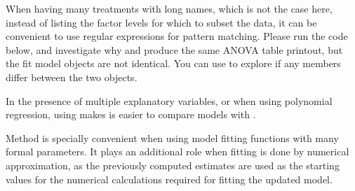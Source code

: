 \documentclass[krantz2]{krantz}\usepackage{knitr}
\begin{document}
\begin{knitrout}\footnotesize
{}\color{fgcolor}
\end{knitrout}

\begin{advplayground}
When having many treatments with long names, which is not the case here, instead of listing the factor levels for which to subset the data, it can be convenient to use regular expressions for pattern matching. Please run the code below, and investigate why  and  produce the same ANOVA table printout, but the fit model objects are not identical. You can use  to explore if any members differ between the two objects.

\begin{knitrout}\footnotesize
{}\color{fgcolor}\begin{kframe}
\begin{alltt}
 \hlkwb{<-}   \hlstd{=} \hlopt{!}\hlstd{(}
\end{alltt}
\end{kframe}
\end{knitrout}

\end{advplayground}

\begin{explainbox}
In the presence of multiple explanatory variables, or when using polynomial regression, using  makes is easier to compare models with .

Method  is specially convenient when using model fitting functions with many formal parameters. It plays an additional role when fitting is done by numerical approximation, as the previously computed estimates are used as the starting values for the numerical calculations required for fitting the updated model.
\end{explainbox}
\end{document}
